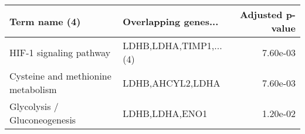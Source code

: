 \begin{tabular}{llr}
\toprule
                     Term name (4) &   Overlapping genes... &  Adjusted p-value \\
\midrule
           HIF-1 signaling pathway & LDHB,LDHA,TIMP1,...(4) &          7.60e-03 \\
Cysteine and methionine metabolism &       LDHB,AHCYL2,LDHA &          7.60e-03 \\
      Glycolysis / Gluconeogenesis &         LDHB,LDHA,ENO1 &          1.20e-02 \\
\bottomrule
\end{tabular}
